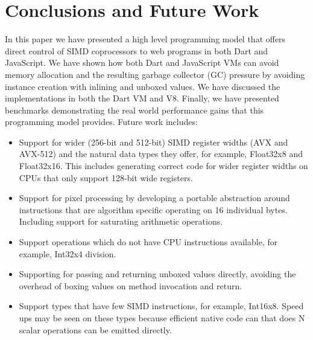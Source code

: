 \documentclass[preprint]{sigplanconf}
\begin{document}
\section{Conclusions and Future Work}
In this paper we have presented a high level programming model that offers direct control of SIMD coprocessors to web programs in both Dart and JavaScript. We have shown how both Dart and JavaScript VMs can avoid memory allocation and the resulting garbage collector (GC) pressure by avoiding instance creation with inlining and unboxed values. We have discussed the implementations in both the Dart VM and V8. Finally, we have presented benchmarks demonstrating the real world performance gains that this programming model provides. Future work includes:
\begin{itemize} 
\item Support for wider (256-bit and 512-bit) SIMD register widths (AVX and AVX-512) and the natural data types they offer, for example, Float32x8 and Float32x16. This includes generating correct code for wider register widths on CPUs that only support 128-bit wide registers.
\item Support for pixel processing by developing a portable abstraction around instructions that are algorithm specific operating on 16 individual bytes. Including support for saturating arithmetic operations.
\item Support operations which do not have CPU instructions available, for example, Int32x4 division. 
\item Supporting for passing and returning unboxed values directly, avoiding the overhead of boxing values on method invocation and return.
\item Support types that have few SIMD instructions, for example, Int16x8. Speed ups may be seen on these types because efficient native code can that does N scalar operations can be emitted directly.
\end{itemize}



\end{document}
